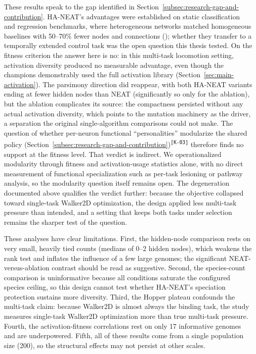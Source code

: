 \documentclass[12pt]{article}
\newcommand{\cohID}[1]{\textsuperscript{\scriptsize\texttt{[#1]}}}
\newcommand{\cohConsistency}[2]{\textcolor{cohConsistency}{#2}\cohID{#1}}
\begin{document}
These results speak to the gap identified in Section~\ref{subsec:research-gap-and-contribution}.
HA-NEAT's advantages were established on static classification and regression benchmarks, where heterogeneous networks matched homogeneous baselines with 50--70\% fewer nodes and connections (\cite{hagg_evolving_2017}); whether they transfer to a temporally extended control task was the open question this thesis tested.
On the fitness criterion the answer here is no: in this multi-task locomotion setting, activation diversity produced no measurable advantage, even though the champions demonstrably used the full activation library (Section~\ref{sec:main-activation}).
The parsimony direction did reappear, with both HA-NEAT variants ending at fewer hidden nodes than NEAT (significantly so only for the ablation), but the ablation complicates its source: the compactness persisted without any actual activation diversity, which points to the mutation machinery as the driver, a separation the original single-algorithm comparisons could not make.
The question of whether per-neuron functional ``personalities'' modularize the shared policy \cohConsistency{K-03}{(Section~\ref{subsec:research-gap-and-contribution})} therefore finds no support at the fitness level.
That verdict is indirect. We operationalized modularity through fitness and activation-usage statistics alone, with no direct measurement of functional specialization such as per-task lesioning or pathway analysis, so the modularity question itself remains open.
The degeneration documented above qualifies the verdict further: because the objective collapsed toward single-task Walker2D optimization, the design applied less multi-task pressure than intended, and a setting that keeps both tasks under selection remains the sharper test of the question.

These analyses have clear limitations.
First, the hidden-node comparison rests on very small, heavily tied counts (medians of 0--2 hidden nodes), which weakens the rank test and inflates the influence of a few large genomes; the significant NEAT-versus-ablation contrast should be read as suggestive.
Second, the species-count comparison is uninformative because all conditions saturate the configured species ceiling, so this design cannot test whether HA-NEAT's speciation protection sustains more diversity.
Third, the Hopper plateau confounds the multi-task claim: because Walker2D is almost always the binding task, the study measures single-task Walker2D optimization more than true multi-task pressure.
Fourth, the activation-fitness correlations rest on only 17 informative genomes and are underpowered.
Fifth, all of these results come from a single population size (200), so the structural effects may not persist at other scales.
\end{document}

